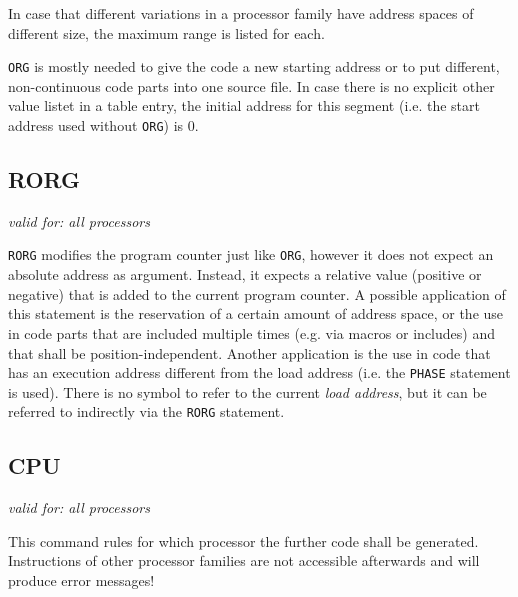 \documentclass[12pt,twoside]{report}
\makeatletter
\newcommand{\tty}[1]{{\tt #1}}
\newcommand{\ttindex}[1]{\index{#1@{\tt #1}}}
\makeatother
\begin{document}
In case that different variations in a processor family have address
spaces of different size, the maximum range is listed for each.

\tty{ORG} is mostly needed to give the code a new starting address or to
put different, non-continuous code parts into one source file.  In case
there is no explicit other value listet in a table entry, the initial
address for this segment (i.e. the start address used without {\tt ORG})
is 0.


\subsection{RORG}
\label{SectRORG}
\ttindex{RORG}

{\em valid for: all processors}

\tty{RORG} modifies the program counter just like \tty{ORG},
however it does not expect an absolute address as argument.
Instead, it expects a relative value (positive or negative) that
is added to the current program counter.  A possible application
of this statement is the reservation of a certain amount of
address space, or the use in code parts that are included
multiple times (e.g. via macros or includes) and that shall be
position-independent.  Another application is the use in code
that has an execution address different from the load address
(i.e. the \tty{PHASE} statement is used).  There is no symbol to
refer to the current {\em load address}, but it can be referred
to indirectly via the \tty{RORG} statement.


\subsection{CPU}
\label{SectCPU}
\ttindex{CPU}

{\em valid for: all processors}

This command rules for which processor the further code shall be
generated.  Instructions of other processor families are not
accessible afterwards and will produce error messages!
\end{document}
